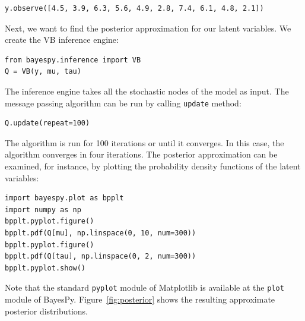 \documentclass[twoside,11pt]{article}
\begin{document}
\begin{lstlisting}
y.observe([4.5, 3.9, 6.3, 5.6, 4.9, 2.8, 7.4, 6.1, 4.8, 2.1])
\end{lstlisting}
Next, we want to find the posterior approximation for our latent variables.  We
create the VB inference engine:
\begin{lstlisting}
from bayespy.inference import VB
Q = VB(y, mu, tau)
\end{lstlisting}
The inference engine takes all the stochastic nodes of the model as input.  The
message passing algorithm can be run by calling \texttt{update} method:
\begin{lstlisting}
Q.update(repeat=100)
\end{lstlisting}
The algorithm is run for 100 iterations or until it converges.  In this case,
the algorithm converges in four iterations.  The posterior approximation can be
examined, for instance, by plotting the probability density functions of the
latent variables:
\begin{lstlisting}
import bayespy.plot as bpplt
import numpy as np
bpplt.pyplot.figure()
bpplt.pdf(Q[mu], np.linspace(0, 10, num=300))
bpplt.pyplot.figure()
bpplt.pdf(Q[tau], np.linspace(0, 2, num=300))
bpplt.pyplot.show()
\end{lstlisting}
Note that the standard \texttt{pyplot} module of Matplotlib is available at the
\texttt{plot} module of BayesPy.  Figure~\ref{fig:posterior} shows the resulting
approximate posterior distributions.
\end{document}
